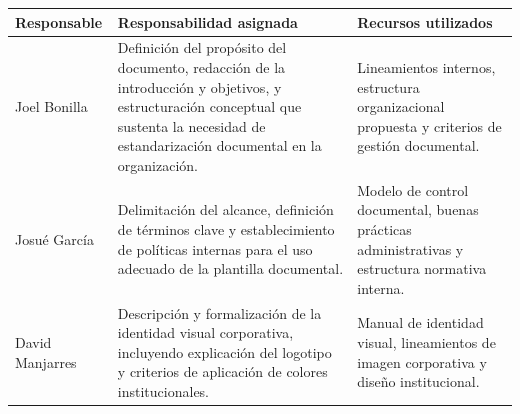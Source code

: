 \documentclass{encabezado}
\begin{document}
\begin{center}
    \footnotesize
    \renewcommand{\arraystretch}{1.6}
    \begin{tabular}{p{3cm} p{7cm} p{4cm}}
        \hline
        \textbf{Responsable}                                                                                                                                                                      & \textbf{Responsabilidad asignada} & \textbf{Recursos utilizados} \\
        \hline
        Joel Bonilla                                                                                                                                                                              &
        Definición del propósito del documento, redacción de la introducción y objetivos, y estructuración conceptual que sustenta la necesidad de estandarización documental en la organización. &
        Lineamientos internos, estructura organizacional propuesta y criterios de gestión documental.                                                                                                                                                                \\
        \hline
        Josué García                                                                                                                                                                              &
        Delimitación del alcance, definición de términos clave y establecimiento de políticas internas para el uso adecuado de la plantilla documental.                                           &
        Modelo de control documental, buenas prácticas administrativas y estructura normativa interna.                                                                                                                                                               \\
        \hline
        David Manjarres                                                                                                                                                                           &
        Descripción y formalización de la identidad visual corporativa, incluyendo explicación del logotipo y criterios de aplicación de colores institucionales.                                 &
        Manual de identidad visual, lineamientos de imagen corporativa y diseño institucional.                                                                                                                                                                       \\

\end{tabular}
\end{center}
\end{document}
